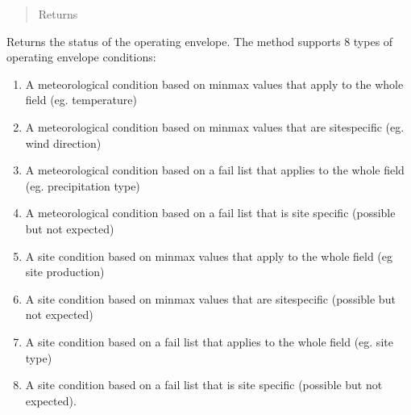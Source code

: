 \documentclass[letterpaper,10pt,english]{sphinxmanual}
\begin{document}
\begin{fulllineitems}
\begin{fulllineitems}
\begin{quote}
\begin{description}
\begin{itemize}
\end{itemize}

\item[{Returns}] \leavevmode


\end{description}\end{quote}

\end{fulllineitems}


\begin{fulllineitems}
\label{\detokenize{index:feast.DetectionModules.abstract_detection_method.DetectionMethod.check_op_envelope}}
Returns the status of the operating envelope. The method supports 8 types of operating envelope conditions:
\begin{enumerate}
%
\item {} 
A meteorological condition based on min\sphinxhyphen{}max values that apply to the whole field (eg. temperature)

\item {} 
A meteorological condition based on min\sphinxhyphen{}max values that are site\sphinxhyphen{}specific (eg. wind direction)

\item {} 
A meteorological condition based on a fail list that applies to the whole field (eg. precipitation type)

\item {} 
A meteorological condition based on a fail list that is site specific (possible but not expected)

\item {} 
A site condition based on min\sphinxhyphen{}max values that apply to the whole field (eg site production)

\item {} 
A site condition based on min\sphinxhyphen{}max values that are site\sphinxhyphen{}specific (possible but not expected)

\item {} 
A site condition based on a fail list that applies to the whole field (eg. site type)

\item {} 
A site condition based on a fail list that is site specific (possible but not expected).


\end{enumerate}
\end{fulllineitems}
\end{fulllineitems}
\end{document}
